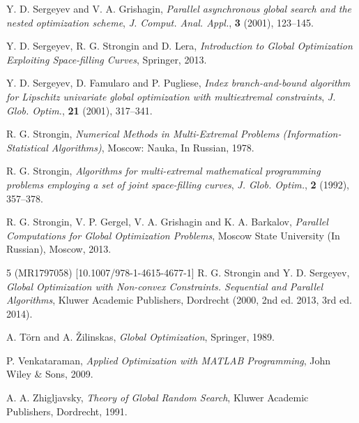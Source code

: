 \documentclass[runningheads]{llncs}
\begin{document}
\begin{thebibliography}{107}
\newblock Y. D. Sergeyev and V. A. Grishagin,
\newblock \emph{\emph{Parallel asynchronous global search and the nested optimization scheme}},
\newblock \emph{J. Comput. Anal. Appl.}, \textbf{3} (2001), 123--145.

\newblock Y. D. Sergeyev, R. G. Strongin and D. Lera,
\newblock \emph{Introduction to Global Optimization Exploiting Space-filling Curves},
\newblock Springer, 2013.

\newblock Y. D. Sergeyev, D. Famularo and P. Pugliese,
\newblock \emph{\emph{Index branch-and-bound algorithm for Lipschitz univariate global optimization with multiextremal constraints}},
\newblock \emph{J. Glob. Optim.}, \textbf{21} (2001), 317--341.

\newblock R. G. Strongin,
\newblock \emph{Numerical Methods in Multi-Extremal Problems (Information-Statistical Algorithms)},
\newblock Moscow: Nauka, In Russian, 1978.

\newblock R. G. Strongin,
\newblock \emph{\emph{Algorithms for multi-extremal mathematical programming problems employing a set of joint space-filling curves}},
\newblock \emph{J. Glob. Optim.}, \textbf{2} (1992), 357--378.

\newblock R. G. Strongin, V. P. Gergel, V. A. Grishagin and K. A. Barkalov,
\newblock \emph{Parallel Computations for Global Optimization Problems},
\newblock Moscow State University (In Russian), Moscow, 2013.

5 (MR1797058) [10.1007/978-1-4615-4677-1]
\newblock R. G. Strongin and Y. D. Sergeyev,
\newblock \emph{Global Optimization with Non-convex Constraints. Sequential and Parallel Algorithms},
\newblock Kluwer Academic Publishers, Dordrecht (2000, 2nd ed. 2013, 3rd ed. 2014).

\newblock A. T\"orn and A. \v Zilinskas,
\newblock \emph{Global Optimization},
\newblock Springer, 1989.

\newblock P. Venkataraman,
\newblock \emph{Applied Optimization with MATLAB Programming},
\newblock John Wiley \& Sons, 2009.

\newblock A. A. Zhigljavsky,
\newblock \emph{Theory of Global Random Search},
\newblock Kluwer Academic Publishers, Dordrecht, 1991.


\end{thebibliography}
\end{document}
